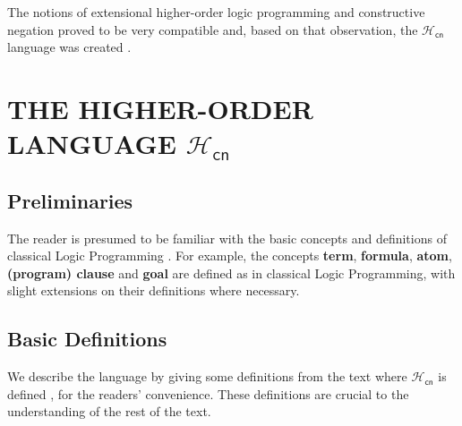 \documentclass[inscr,ack,preface]{dithesis}
\theoremstyle{definition}
\newcommand{\hcn}{$\mathcal{H}_\mathsf{cn}$}
\begin{document}
The notions of extensional higher-order logic programming and constructive negation proved to be very compatible and, based on that observation, the \hcn{} language was created \cite{DBLP:conf/kr/CharalambidisR14}.

\chapter{THE HIGHER-ORDER LANGUAGE \hcn}
\label{chap:hcn}

\section{Preliminaries}
The reader is presumed to be familiar with the basic concepts and definitions of classical Logic Programming \cite{Lloyd:1987:FLP:39279}. For example, the concepts \textbf{term}, \textbf{formula}, \textbf{atom}, \textbf{(program) clause} and \textbf{goal} are defined as in classical Logic Programming, with slight extensions on their definitions where necessary.

\section{Basic Definitions}
We describe the language by giving some definitions from the text where \hcn{} is defined \cite{DBLP:conf/kr/CharalambidisR14}, for the readers' convenience. These definitions are crucial to the understanding of the rest of the text.
\end{document}
